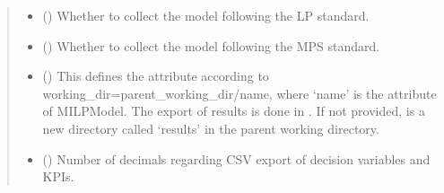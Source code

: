 \documentclass[letterpaper,10pt,english]{sphinxmanual}
\begin{document}
\begin{fulllineitems}
\begin{fulllineitems}
\begin{quote}
\begin{description}
\begin{itemize}
\item {} 
\sphinxAtStartPar
{} (\sphinxstyleliteralemphasis{\sphinxupquote{, }}\sphinxstyleliteralemphasis{\sphinxupquote{, }}\sphinxstyleliteralemphasis{\sphinxupquote{, }}) \textendash{} Whether to collect the model following the LP standard.

\item {} 
\sphinxAtStartPar
{} (\sphinxstyleliteralemphasis{\sphinxupquote{, }}\sphinxstyleliteralemphasis{\sphinxupquote{, }}) \textendash{} Whether to collect the model following the MPS standard.

\item {} 
\sphinxAtStartPar
{} (\sphinxstyleliteralemphasis{\sphinxupquote{, }}) \textendash{} This defines the  attribute according to working\_dir=parent\_working\_dir/name,
where ‘name’ is the  attribute of MILPModel.
The export of results is done in .
If not provided,  is a new directory called ‘results’ in the parent working directory.

\item {} 
\sphinxAtStartPar
{} (\sphinxstyleliteralemphasis{\sphinxupquote{, }}\sphinxstyleliteralemphasis{\sphinxupquote{, }}) \textendash{} Number of decimals regarding CSV export of decision variables and KPIs.


\end{itemize}
\end{description}
\end{quote}
\end{fulllineitems}
\end{fulllineitems}
\end{document}
